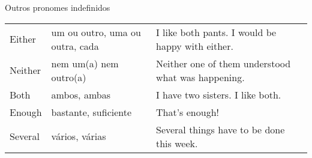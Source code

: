 \documentclass[compress,mathserif,xcolor=table]{beamer}
\begin{document}
\begin{frame}{Outros pronomes indefinidos}
\begin{table}[]
{\begin{tabular}{@{}lll@{}}
\rowcolor[HTML]{FFFFFF} 
{\color[HTML]{404040} Either} &
  {\color[HTML]{404040} um ou outro, uma ou outra,   cada} &
  {\color[HTML]{404040} I like both pants. I would be happy with either.} \\
\rowcolor[HTML]{FFFFFF} 
{\color[HTML]{404040} Neither} &
  {\color[HTML]{404040} nem um(a) nem outro(a)} &
  {\color[HTML]{404040} Neither one of them understood what was happening.} \\
\rowcolor[HTML]{FFFFFF} 
{\color[HTML]{404040} Both} &
  {\color[HTML]{404040} ambos, ambas} &
  {\color[HTML]{404040} I have two sisters. I like both.} \\
\rowcolor[HTML]{FFFFFF} 
{\color[HTML]{404040} Enough} &
  {\color[HTML]{404040} bastante, suficiente} &
  {\color[HTML]{404040} That's enough!} \\
\rowcolor[HTML]{FFFFFF} 
{\color[HTML]{404040} Several} &
  {\color[HTML]{404040} vários, várias} &
  {\color[HTML]{404040} Several things have to be done this week.} \\ \bottomrule
\end{tabular}%
}
\end{table}

\end{frame}
\end{document}
